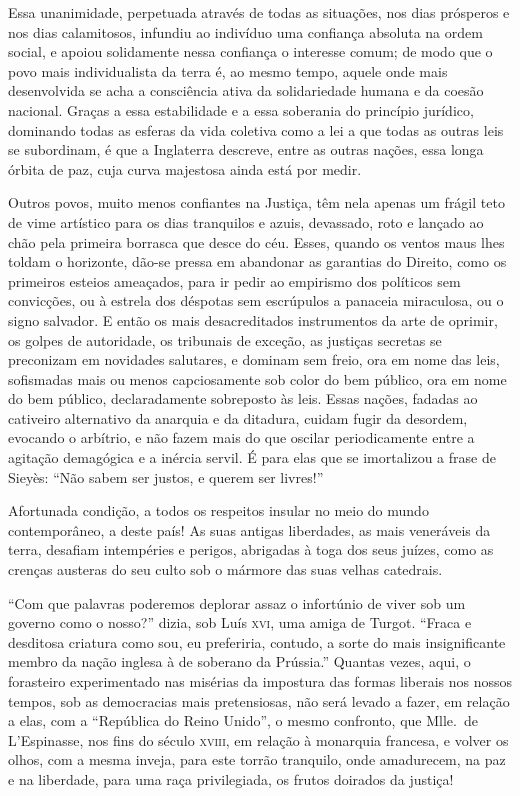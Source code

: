 Essa unanimidade, perpetuada através de todas as situações, nos dias
prósperos e nos dias calamitosos, infundiu ao indivíduo uma confiança 
absoluta na ordem social, e apoiou solidamente
nessa confiança o interesse comum; de modo que o povo mais
individualista da terra é, ao mesmo tempo, aquele onde mais
desenvolvida se acha a consciência ativa da solidariedade humana e da
coesão nacional. Graças a essa estabilidade e a essa soberania do
princípio jurídico, dominando todas as esferas da vida coletiva como a
lei a que todas as outras leis se subordinam, é que a Inglaterra
descreve, entre as outras nações, essa longa órbita de paz, cuja curva
majestosa ainda está por medir.

Outros povos, muito menos confiantes na Justiça, têm nela apenas um
frágil teto de vime artístico para os dias tranquilos e azuis,
devassado, roto e lançado ao chão pela primeira borrasca que desce do
céu. Esses, quando os ventos maus lhes toldam o horizonte, dão-se
pressa em abandonar as garantias do Direito, como os primeiros esteios
ameaçados, para ir pedir ao empirismo dos políticos sem convicções, ou
à estrela dos déspotas sem escrúpulos a panaceia miraculosa, ou o signo
salvador. E então os mais desacreditados instrumentos da arte de
oprimir, os golpes de autoridade, os tribunais de exceção, as justiças
secretas se preconizam em novidades salutares, e dominam sem freio, ora
em nome das leis, sofismadas mais ou menos capciosamente sob color do
bem público, ora em nome do bem público, declaradamente sobreposto às
leis. Essas nações, fadadas ao cativeiro alternativo da anarquia e da
ditadura, cuidam fugir da desordem, evocando o arbítrio, e não fazem
mais do que oscilar periodicamente entre a agitação demagógica e a
inércia servil. É para elas que se imortalizou a frase de Sieyès:
``Não sabem ser justos, e querem ser livres!''

Afortunada condição, a todos os respeitos insular no meio do mundo
contemporâneo, a deste país! As suas antigas liberdades, as mais
veneráveis da terra, desafiam intempéries e perigos, abrigadas à toga
dos seus juízes, como as crenças austeras do seu culto sob o mármore
das suas velhas catedrais.

``Com que palavras poderemos deplorar assaz o infortúnio de
viver sob um governo como o nosso?'' dizia, sob Luís \textsc{xvi},
uma amiga de Turgot.
``Fraca e desditosa criatura como sou, eu preferiria, contudo, 
a sorte do mais insignificante membro da nação inglesa à de soberano da Prússia.''
Quantas vezes, aqui, o forasteiro experimentado nas misérias da impostura das formas
liberais nos nossos tempos, sob as democracias mais pretensiosas, não
será levado a fazer, em relação a elas, com a ``República
do Reino Unido'', o mesmo confronto, que Mlle.~de L'Espinasse, nos fins do século \textsc{xviii}, em relação à 	 
monarquia francesa, e volver os olhos, com a mesma inveja, para este
torrão tranquilo, onde amadurecem, na paz e na liberdade, para uma raça 		 
privilegiada, os frutos doirados da justiça!
